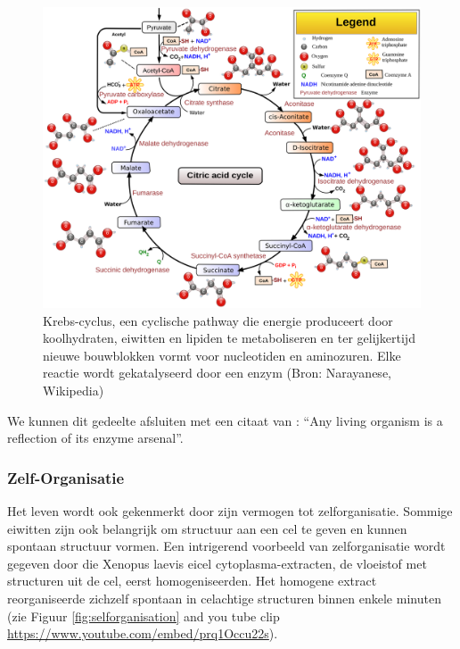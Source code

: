 \documentclass[
  11pt,
]{book}
\begin{document}
\begin{figure}

{\centering \includegraphics[width=0.7\linewidth]{./figs/Citric_acid_cycle_with_aconitate_2} 

}

\caption{ Krebs-cyclus, een cyclische pathway die energie produceert door koolhydraten, eiwitten en lipiden te metaboliseren en ter gelijkertijd nieuwe bouwblokken vormt voor nucleotiden en aminozuren. Elke reactie wordt gekatalyseerd door een enzym (Bron: Narayanese, Wikipedia)}\label{fig:krebsCycle}
\end{figure}

We kunnen dit gedeelte afsluiten met een citaat van \citet{deDuve2002}: ``Any living organism is a reflection of its enzyme arsenal''.

\hypertarget{zelf-organisatie}{%
\subsubsection{Zelf-Organisatie}\label{zelf-organisatie}}

Het leven wordt ook gekenmerkt door zijn vermogen tot zelforganisatie. Sommige eiwitten zijn ook belangrijk om structuur aan een cel te geven en kunnen spontaan structuur vormen. Een intrigerend voorbeeld van zelforganisatie wordt gegeven door \citet{Cheng2019} die Xenopus laevis eicel cytoplasma-extracten, de vloeistof met structuren uit de cel, eerst homogeniseerden. Het homogene extract reorganiseerde zichzelf spontaan in celachtige structuren binnen enkele minuten (zie Figuur \ref{fig:selforganisation} and you tube clip \url{https://www.youtube.com/embed/prq1Occu22s}).
\end{document}

